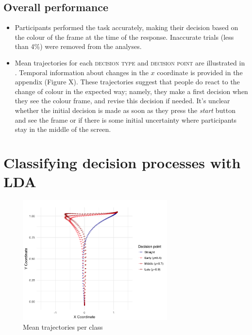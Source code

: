 \documentclass{article}
\newcommand{\addMM}[1]{{\leavevmode\color{red}#1}}
\begin{document}
\subsection{Overall performance}
\begin{itemize}
\item Participants performed the task accurately, making their decision based on the colour of the frame at the time of the response. Inaccurate trials (less than 4\%) were removed from the analyses. 
\item Mean trajectories for each \textsc{decision type} and \textsc{decision point} are illustrated in . 
Temporal information about changes in the $x$ coordinate is provided in the appendix (Figure X). 
These trajectories suggest that people do react to the change of colour in the expected way; namely, they make a first decision when they see the colour frame, and revise this decision if needed. \addMM{It's unclear whether the initial decision is made as soon as they press the \textit{start} button and see the frame or if there is some initial uncertainty where participants stay in the middle of the screen.}

\end{itemize}

\section{Classifying decision processes with LDA}

\begin{figure}
\centering
\includegraphics[width=0.7\textwidth]{calibration_mean_trajectory_pointchang.png}
\caption{Mean trajectories per class}\label{fig:mean.trajectories.calibration}
\end{figure}
\end{document}
